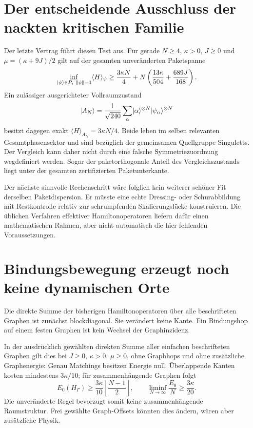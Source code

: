 \section{Der entscheidende Ausschluss der nackten kritischen Familie}
Der letzte Vertrag führt diesen Test aus. Für gerade $N\ge4$, $\kappa>0$, $J\ge0$ und $\mu=(\kappa+9J)/2$ gilt auf der gesamten unveränderten Paketspanne
\[
 \inf_{\lvert \psi\rangle\in P,\ \|\psi\|=1}\langle H\rangle_\psi
 \ge\frac{3\kappa N}{4}
 +N\left(\frac{13\kappa}{504}+\frac{689J}{168}\right).
\]
Ein zulässiger ausgerichteter Vollraumzustand
\[
 \lvert A_N\rangle=\frac1{\sqrt{240}}\sum_\alpha
 \lvert \alpha\rangle^{\otimes N}\lvert \psi_\alpha\rangle^{\otimes N}
\]
besitzt dagegen exakt $\langle H\rangle_{A_N}=3\kappa N/4$. Beide leben im selben relevanten Gesamtphasensektor und sind bezüglich der gemeinsamen Quellgruppe Singuletts. Der Vergleich kann daher nicht durch eine falsche Symmetriezuordnung wegdefiniert werden. Sogar der paketorthogonale Anteil des Vergleichszustands liegt unter der gesamten zertifizierten Paketunterkante. 


Der nächste sinnvolle Rechenschritt wäre folglich kein weiterer schöner Fit derselben Paketdispersion. Er müsste eine echte Dressing- oder Schurabbildung mit Restkontrolle relativ zur schrumpfenden Skalierungslücke konstruieren. Die üblichen Verfahren effektiver Hamiltonoperatoren liefern dafür einen mathematischen Rahmen, aber nicht automatisch die hier fehlenden Voraussetzungen. \cite{sw}

\section{Bindungsbewegung erzeugt noch keine dynamischen Orte}
Die direkte Summe der bisherigen Hamiltonoperatoren über alle beschrifteten Graphen ist zunächst blockdiagonal. Sie verändert keine Kante. Ein Bindungshop auf einem festen Graphen ist kein Wechsel der Graphinzidenz. 

In der ausdrücklich gewählten direkten Summe aller einfachen beschrifteten Graphen gilt dies bei $J\ge0$, $\kappa>0$, $\mu\ge0$, ohne Graphhops und ohne zusätzliche Graphenergie: Genau Matchings besitzen Energie null. Überlappende Kanten kosten mindestens $3\kappa/10$; für zusammenhängende Graphen folgt
\[
 E_0(H_\Gamma)\ge\frac{3\kappa}{10}\left\lfloor\frac{N-1}{2}\right\rfloor,
 \qquad\liminf_{N\to\infty}\frac{E_0}{N}\ge\frac{3\kappa}{20}.
\]
Die unveränderte Regel bevorzugt somit keine zusammenhängende Raumstruktur. Frei gewählte Graph-Offsets könnten dies ändern, wären aber zusätzliche Physik. 

